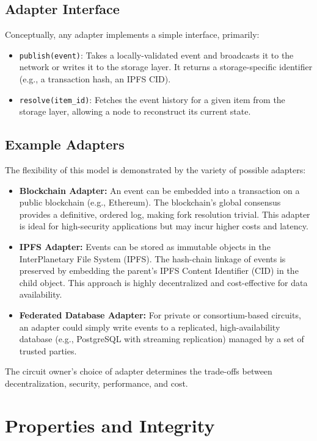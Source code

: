 \documentclass{article}
\begin{document}
\subsection{Adapter Interface}
Conceptually, any adapter implements a simple interface, primarily:
\begin{itemize}
    \item \texttt{publish(event)}: Takes a locally-validated event and broadcasts it to the network or writes it to the storage layer. It returns a storage-specific identifier (e.g., a transaction hash, an IPFS CID).
    \item \texttt{resolve(item\_id)}: Fetches the event history for a given item from the storage layer, allowing a node to reconstruct its current state.
\end{itemize}

\subsection{Example Adapters}
The flexibility of this model is demonstrated by the variety of possible adapters:
\begin{itemize}
    \item \textbf{Blockchain Adapter:} An event can be embedded into a transaction on a public blockchain (e.g., Ethereum). The blockchain's global consensus provides a definitive, ordered log, making fork resolution trivial. This adapter is ideal for high-security applications but may incur higher costs and latency.
    \item \textbf{IPFS Adapter:} Events can be stored as immutable objects in the InterPlanetary File System (IPFS). The hash-chain linkage of events is preserved by embedding the parent's IPFS Content Identifier (CID) in the child object. This approach is highly decentralized and cost-effective for data availability.
    \item \textbf{Federated Database Adapter:} For private or consortium-based circuits, an adapter could simply write events to a replicated, high-availability database (e.g., PostgreSQL with streaming replication) managed by a set of trusted parties.
\end{itemize}
The circuit owner's choice of adapter determines the trade-offs between decentralization, security, performance, and cost.

\section{Properties and Integrity}
\end{document}
